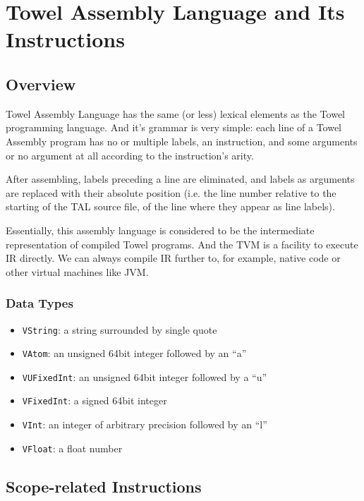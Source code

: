 \documentclass{report}
\begin{document}
\chapter{Towel Assembly Language and Its Instructions}

\section{Overview}

Towel Assembly Language has the same (or less) lexical elements as the Towel programming language. And it's grammar is very simple: each line of a Towel Assembly program has no or multiple labels, an instruction, and some arguments or no argument at all according to the instruction's arity.

After assembling, labels preceding a line are eliminated, and labels as arguments are replaced with their absolute position (i.e. the line number relative to the starting of the TAL source file, of the line where they appear as line labels).

Essentially, this assembly language is considered to be the intermediate representation of compiled Towel programs. And the TVM is a facility to execute IR directly. We can always compile IR further to, for example, native code or other virtual machines like JVM.

\subsection{Data Types}

\begin{itemize}
\item \texttt{VString}: a string surrounded by single quote
\item \texttt{VAtom}: an unsigned 64bit integer followed by an ``a''
\item \texttt{VUFixedInt}: an unsigned 64bit integer followed by a ``u''
\item \texttt{VFixedInt}: a signed 64bit integer
\item \texttt{VInt}: an integer of arbitrary precision followed by an ``l''
\item \texttt{VFloat}: a float number
\end{itemize}

\section{Scope-related Instructions}
\end{document}
